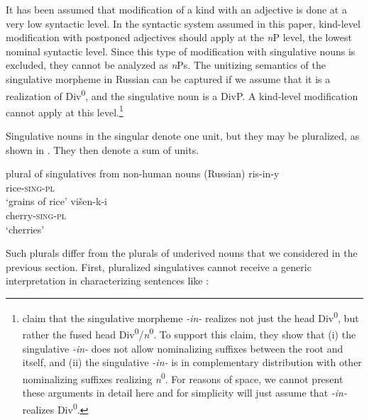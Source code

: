\documentclass[output=paper,colorlinks,citecolor=brown,
]{langscibook}
\begin{document}
It has been assumed that modification of a kind with an adjective is done at a very low syntactic level. In the syntactic system assumed in this paper, kind-level modification with postponed adjectives should apply at the \textit{n}P level, the lowest nominal syntactic level. Since this type of modification with singulative nouns is excluded, they cannot be analyzed as \textit{n}Ps. The unitizing semantics of the singulative morpheme in Russian can be captured if we assume that it is a realization of Div\textsuperscript{0}, and the singulative noun is a DivP. A kind-level modification cannot apply at this level.\footnote{\citet{ErschlerGeistKagan} claim that the singulative morpheme \textit{-in-} realizes not just the head Div\textsuperscript{0}, but rather the fused head Div\textsuperscript{0}/\textit{n}\textsuperscript{0}. To support this claim, they show that (i) the singulative \textit{-in-} does not allow nominalizing suffixes between the root and itself, and (ii) the singulative \textit{-in-} is in complementary distribution with other nominalizing suffixes realizing \textit{n}\textsuperscript{0}. For reasons of space, we cannot present these arguments in detail here and for simplicity will just assume that \textit{-in-} realizes Div\textsuperscript{0}.}

Singulative nouns in the singular denote one unit, but they may be pluralized, as shown in . They then denote a sum of units.  

\ea\label{ex:26}
plural of singulatives from non-human nouns \hfill (Russian)
\ea\label{ex:26a}
\gll ris-in-y \\
rice-\textsc{sing-pl} \\
\glt `grains of rice'
\ex\label{ex:26b}
\gll višen-k-i \\
cherry-\textsc{sing-pl} \\
\glt `cherries'
\z\z

\noindent Such plurals differ from the plurals of underived nouns that we considered in the previous section. First, pluralized singulatives cannot receive a generic interpretation in characterizing sentences like :

\label{ex:27}
\z
\end{document}
